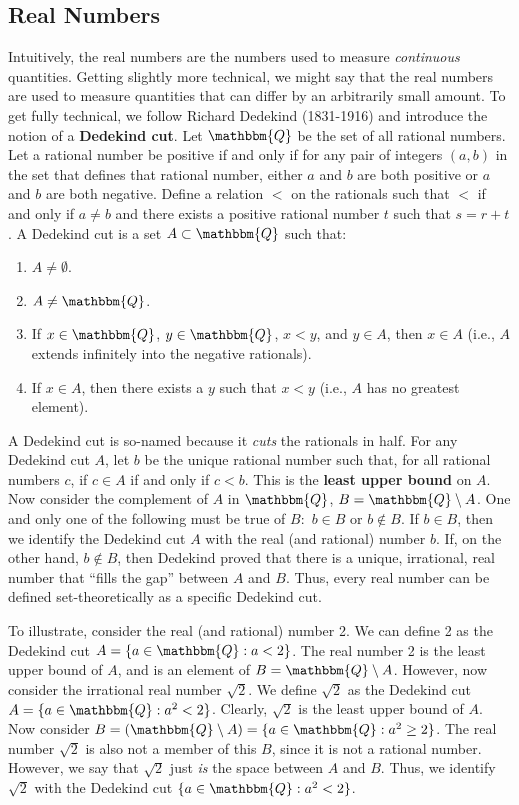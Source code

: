 \documentclass[11pt]{article}
\theoremstyle{definition}
\theoremstyle{remark}
\begin{document}
\subsection{Real Numbers}
Intuitively, the real numbers are the numbers used to measure \textit{continuous} quantities. Getting slightly more technical, we might say that the real numbers are used to measure quantities that can differ by an arbitrarily small amount. To get fully technical, we follow Richard Dedekind (1831-1916) and introduce the notion of a \textbf{Dedekind cut}. Let $\mathbbm{Q}$ be the set of all rational numbers. Let a rational number be positive if and only if for any pair of integers $(a,b)$ in the set that defines that rational number, either $a$ and $b$ are both positive or $a$ and $b$ are both negative. Define a relation $<$ on the rationals such that $<$ if and only if  $a\neq b$ and there exists a positive rational number $t$ such that $s = r + t$. A Dedekind cut is a set $A\subset\mathbbm{Q}$ such that:
\begin{enumerate}
    \item $A\neq \emptyset$.

    \item $A\neq \mathbbm{Q}$.

    \item If $x\in\mathbbm{Q}$, $y\in\mathbbm{Q}$, $x<y$, and $y\in A$, then $x\in A$ (i.e., $A$ extends infinitely into the negative rationals).

    \item If $x\in A$, then there exists a $y$ such that $x<y$ (i.e., $A$ has no greatest element).
\end{enumerate}
A Dedekind cut is so-named because it \textit{cuts} the rationals in half. For any Dedekind cut $A$, let $b$ be the unique rational number such that, for all rational numbers $c$, if $c\in A$ if and only if $c<b$. This is the \textbf{least upper bound} on $A$. Now consider the complement of $A$ in $\mathbbm{Q}$, $B=\mathbbm{Q}\setminus A$. One and only one of the following must be true of $B$:\ $b\in B$ or $b\not\in B$. If $b\in B$, then we identify the Dedekind cut $A$ with the real (and rational) number $b$. If, on the other hand, $b\not\in B$, then Dedekind proved that there is a unique, irrational, real number that ``fills the gap'' between $A$ and $B$. Thus, every real number can be defined set-theoretically as a specific Dedekind cut.\par

To illustrate, consider the real (and rational) number 2. We can define 2 as the Dedekind cut $A=\{a\in\mathbbm{Q}:a<2\}$. The real number 2 is the least upper bound of $A$, and is an element of $B=\mathbbm{Q}\setminus A$. However, now consider the irrational real number $\sqrt{2}$. We define $\sqrt{2}$ as the Dedekind cut $A=\{a\in\mathbbm{Q}:a^{2}<2\}$. Clearly, $\sqrt{2}$ is the least upper bound of $A$. Now consider $B=(\mathbbm{Q}\setminus A)=\{a\in\mathbbm{Q}:a^{2}\geq2\}$. The real number $\sqrt{2}$ is also not a member of this $B$, since it is not a rational number. However, we say that $\sqrt{2}$ just \textit{is} the space between $A$ and $B$. Thus, we identify $\sqrt{2}$ with the Dedekind cut $\{a\in\mathbbm{Q}:a^{2}<2\}$.
\end{document}
